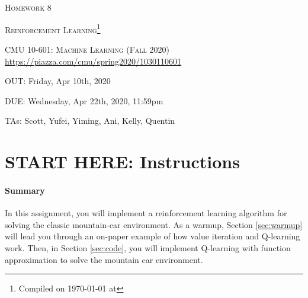 \documentclass[11pt]{article}
\date{}
\numberwithin{equation}{section} %
\numberwithin{figure}{section} %
\numberwithin{table}{section} %
\begin{document}
\section*{}
\begin{center}
  \centerline{\textsc{\LARGE  Homework 8}}
  \vspace{0.5em}
  \centerline{\textsc{\LARGE Reinforcement Learning}\footnote{Compiled on \today{} at \currenttime{}}}
  \vspace{1em}
  \textsc{\large CMU 10-601: Machine Learning (Fall 2020)} \\
  \vspace{0.5em}
  \url{https://piazza.com/cmu/spring2020/1030110601} \\
  \vspace{0.5em}
  \centerline{OUT: Friday, Apr 10th, 2020}
  \vspace{0.5em}
  \centerline{DUE: Wednesday, Apr 22th, 2020, 11:59pm}
    \centerline{TAs: Scott, Yufei, Yiming, Ani, Kelly, Quentin}
\end{center}

\section*{START HERE: Instructions}

\begin{notebox}
\paragraph{Summary} In this assignment, you will implement a reinforcement learning algorithm for solving the classic mountain-car environment. As a warmup, Section \ref{sec:warmup} will lead you through an on-paper example of how value iteration and Q-learning work. Then, in Section \ref{sec:code}, you will implement Q-learning with function approximation to solve the mountain car environment.
\end{notebox}
\end{document}

